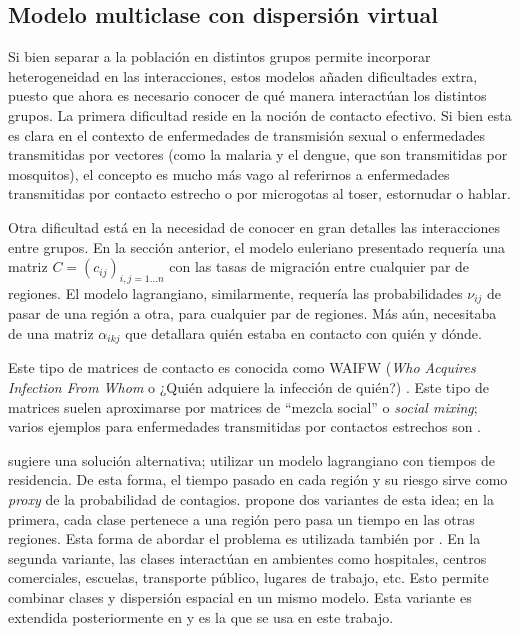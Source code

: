 \subsection{Modelo multiclase con dispersión virtual}\label{modelo-clases-vs-ambientes}

Si bien separar a la población en distintos grupos permite incorporar heterogeneidad en las interacciones, estos modelos añaden dificultades extra, puesto que ahora es necesario conocer de qué manera interactúan los distintos grupos. La primera dificultad reside en la noción de contacto efectivo. Si bien esta es clara en el contexto de enfermedades de transmisión sexual o enfermedades transmitidas por vectores (como la malaria y el dengue, que son transmitidas por mosquitos), el concepto es mucho más vago al referirnos a enfermedades transmitidas por contacto estrecho o por microgotas al toser, estornudar o hablar.

Otra dificultad está en la necesidad de conocer en gran detalles las interacciones entre grupos. En la sección anterior, el modelo euleriano presentado requería una matriz \(C = (c_{ij})_{i,j = 1 \dots n} \) con las tasas de migración entre cualquier par de regiones. El modelo lagrangiano, similarmente, requería las probabilidades \(\nu_{ij}\) de pasar de una región a otra, para cualquier par de regiones. Más aún, necesitaba de una matriz \(\alpha_{ikj}\) que detallara quién estaba en contacto con quién y dónde.

Este tipo de matrices de contacto es conocida como WAIFW (\textit{Who Acquires Infection From Whom} o  ¿Quién adquiere la infección de quién?) \cite{Anderson1992}. Este tipo de matrices suelen aproximarse por matrices de ``mezcla social'' o \textit{social mixing}; varios ejemplos para enfermedades transmitidas por contactos estrechos son \cite{Mossong2008}\cite{Wallinga2006}\cite{Edmunds2006}.

\cite{Bichara2015} sugiere una solución alternativa; utilizar un modelo lagrangiano con tiempos de residencia. De esta forma, el tiempo pasado en cada región y su riesgo sirve como \textit{proxy} de la probabilidad de contagios. \cite{Bichara2015} propone dos variantes de esta idea; en la primera, cada clase pertenece a una región pero pasa un tiempo en las otras regiones. Esta forma de abordar el problema es utilizada también por \cite{Cosner2009}. En la segunda variante, las clases interactúan en ambientes como hospitales, centros comerciales, escuelas, transporte público, lugares de trabajo, etc. Esto permite combinar clases y dispersión espacial en un mismo modelo. Esta variante es extendida posteriormente en \cite{Bichara2018} y es la que se usa en este trabajo.

